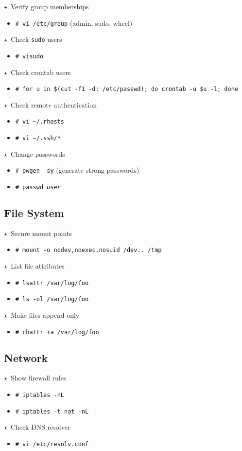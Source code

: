 \documentclass[10pt,landscape]{article}
\newcommand{\os}[1]{\texttt{\footnotesize{#1}}}
\newcommand{\bsd}{\os{B}}
\newcommand{\unix}{\os{U}}
\newcommand{\linux}{\os{L}}
\newenvironment{action}[1]
  {\begin{minipage}[c]{\linewidth}$\star$~#1\begin{itemize}[leftmargin=1cm]}
  {\end{itemize}\end{minipage}\vspace*{3pt}}
\newcommand{\cmd}[2]{\item[#1] {\small\tt\# #2}}
\newcommand{\comment}[1]{\textrm{\small(#1)}}
\begin{document}
\begin{multicols*}{3}
\begin{action}{Verify group memberships}
  \cmd{\unix}{vi /etc/group} \comment{admin, sudo, wheel}
\end{action}

\begin{action}{Check \texttt{sudo} users}
  \cmd{\unix}{visudo}
\end{action}

\begin{action}{Check crontab users}
  \cmd{\unix}{for u in \$(cut -f1 -d: /etc/passwd); do crontab -u \$u -l; done}
\end{action}

\begin{action}{Check remote authentication}
  \cmd{\unix}{vi \textasciitilde/.rhosts}
  \cmd{\unix}{vi \textasciitilde/.ssh/*}
\end{action}

\begin{action}{Change passwords}
\cmd{\unix}{pwgen -sy} \comment{generate strong passwords}
\cmd{\unix}{passwd \emph{user}}
\end{action}

\subsection*{File System}

\begin{action}{Secure mount points}
\cmd{\unix}{mount -o nodev,noexec,nosuid /dev.. /tmp}
\end{action}

\begin{action}{List file attributes}
\cmd{\linux}{lsattr /var/log/foo}
\cmd{\bsd}{ls -ol /var/log/foo}
\end{action}

\begin{action}{Make files append-only}
\cmd{\linux}{chattr +a /var/log/foo}
\end{action}

\subsection*{Network}

\begin{action}{Show firewall rules}
\cmd{\linux}{iptables -nL}
\cmd{\linux}{iptables -t nat -nL}
\end{action}

\begin{action}{Check DNS resolver}
\cmd{\unix}{vi /etc/resolv.conf}
\end{action}


\end{multicols*}
\end{document}
